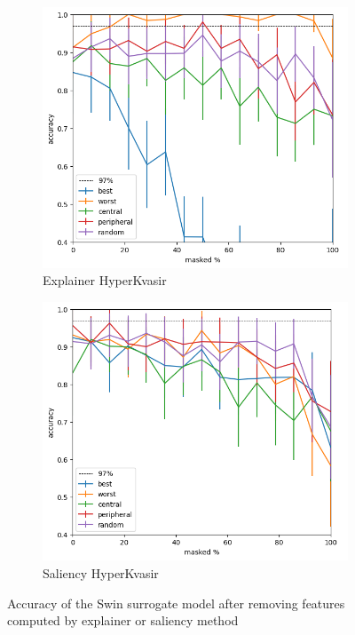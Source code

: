 \documentclass[magisterska,en]{pracamgr}
\begin{document}
\begin{figure}
\centering
\begin{subfigure}{.7\textwidth}
  \centering
  \includegraphics[width=.8\linewidth]{./images/swin_gastro_masking_explainer_patches_accuracy_half-0.png}
  \caption{Explainer HyperKvasir}
  \label{fig:sub1}
\end{subfigure}%
\begin{subfigure}{.7\textwidth}
  \centering
  \includegraphics[width=.8\linewidth]
{./images/swin_gastro_masking_saliency_patches_accuracy_half-0.png}
  \caption{Saliency HyperKvasir}
  \label{fig:sub2}
\end{subfigure}
\caption{Accuracy of the Swin surrogate model after removing features computed by explainer or saliency method}
\label{fig:Swin_Saliency_Explainer_HyperKvasir}
\end{figure}
\end{document}
